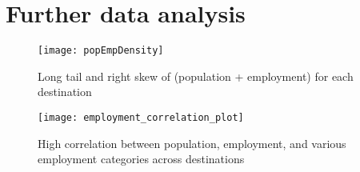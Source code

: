 \chapter{Further data analysis}

\begin{figure}[H]
\centering
\texttt{[image: popEmpDensity]}
\caption{Long tail and right skew of (population + employment) for each destination}
\label{fig:pop-emp-density}
\end{figure}


\begin{figure}[H]
\centering
\texttt{[image: employment\_correlation\_plot]}
\caption{High correlation between population, employment, and various employment categories across destinations}
\label{fig:pop-emp-correlation}
\end{figure}

